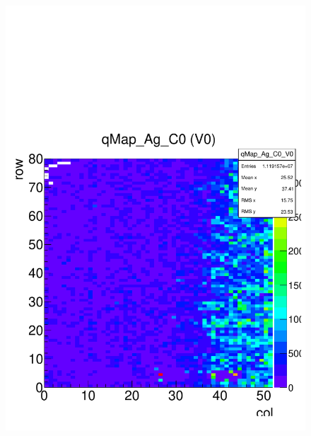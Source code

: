 \documentclass[a4paper,12pt,twoside]{article}
\begin{document}
\begin{figure} [h!] 
\centering
\begin{minipage}{.48\textwidth}
  \centering
  \includegraphics[width=\textwidth]{./HRData_qMap.pdf}
  \label{HRData-Qmap}
\end{minipage}%
\hspace{2mm}
\begin{minipage}{.48\textwidth}
  \centering

\end{minipage}
\end{figure}
\end{document}
